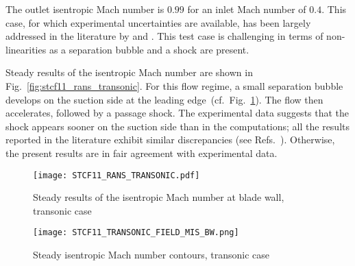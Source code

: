 
The outlet isentropic Mach number is $0.99$ for an inlet Mach number of $0.4$. 
This case, for which experimental uncertainties are available, 
has been largely addressed in the literature by
\citet{Sbardella2001,Duta2002,Campobasso2003} and \citet{Cinnella2004}. 
This test case is challenging in terms of non-linearities as a separation bubble and a shock are present.

Steady results of the isentropic Mach number are shown in
Fig.~\ref{fig:stcf11_rans_transonic}.  For this flow regime,
a small separation
bubble develops on the suction side at the leading edge~(cf.~Fig.~\ref{fig:stcf11_transonic_field_mis_bw}).  The flow then accelerates, followed by a passage shock.  
The experimental data suggests that the shock appears
sooner on the suction side than in the computations; all the results 
reported in the literature exhibit similar discrepancies (see
Refs.~\cite{Fransson1999,Sbardella2001,Duta2002,Campobasso2003,Cinnella2004}). 
Otherwise, the present results are in fair agreement with experimental data.
\begin{figure}[htb]
  \centering
  \begin{minipage}[b]{.46\linewidth}
    \centering
    \texttt{[image: STCF11\_RANS\_TRANSONIC.pdf]}
    \caption{Steady results of the isentropic Mach number at blade
      wall, transonic case}
    \label{fig:stcf11_rans_transonic}
  \end{minipage}\quad
  \begin{minipage}[b]{.46\linewidth}
    \centering
    \texttt{[image: STCF11\_TRANSONIC\_FIELD\_MIS\_BW.png]}
    \caption{Steady isentropic Mach number contours, transonic case}
    \label{fig:stcf11_transonic_field_mis_bw}
  \end{minipage}
\end{figure}

